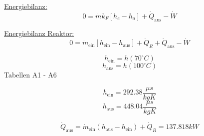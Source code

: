 

\item[a)] \underline{Energiebilanz:}
    \[
    0 = \dot{m} k_F \left[ h_e - h_a \right] + \dot{Q}_{\text{aus}} - \dot{W}
    \]
    
    \underline{Energiebilanz Reaktor:}
    \[
    0 = \dot{m}_{\text{ein}} \left[ h_{\text{ein}} - h_{\text{aus}} \right] + \dot{Q}_R + \dot{Q}_{\text{aus}} - \dot{W}
    \]
    
    \[
    h_{\text{ein}} = h(70^\circ C)
    \]
    \[
    h_{\text{aus}} = h(100^\circ C)
    \]
    Tabellen A1 - A6
    
    \[
    h_{\text{ein}} = 292.38 \frac{\mu s}{kg K}
    \]
    \[
    h_{\text{aus}} = 448.04 \frac{\mu s}{kg K}
    \]
    
    \[
    \dot{Q}_{\text{aus}} = \dot{m}_{\text{ein}} (h_{\text{aus}} - h_{\text{ein}}) + \dot{Q}_R = 137.818 kW
    \]